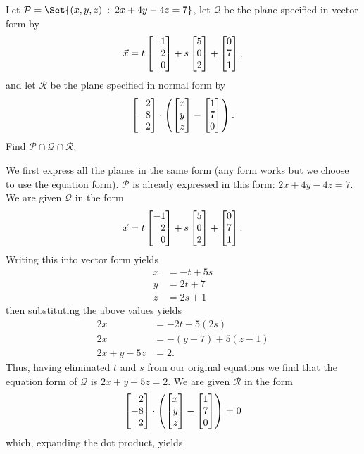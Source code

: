 \begin{exercises}
\begin{problist}
		\prob
		Let $\mathcal P=
			\Set{(x,y,z)\given 2x+4y-4z=7}
		$,
		let $\mathcal Q$ be the plane specified in vector form by
		\[
			\vec x = t\mat{-1\\2\\0}+s\mat{5\\0\\2}+\mat{0\\7\\1},
		\]
		and let $\mathcal R$ be the plane specified in normal form by
		\[
			\mat{2\\-8\\2} \cdot \left(\mat{x\\y\\z}-\mat{1\\7\\0}\right).
		\]
		Find $\mathcal P\cap\mathcal Q\cap\mathcal R$.
		\begin{solution}
			We first express all the planes in the same form (any form works but we choose to use the equation form).
			$\mathcal{P}$ is already expressed in this form: $2x+4y-4z=7$.\\
			We are given $\mathcal{Q}$ in the form
			\[
				\vec x=t\mat{-1\\2\\0}+s\mat{5\\0\\2}+\mat{0\\7\\1}.
			\]
			Writing this into vector form yields
			\begin{align*}
				x&=-t+5s\\
				y&=2t+7\\
				z&=2s+1
			\end{align*}
			then substituting the above values yields 
			\begin{align*}
				2x&=-2t+5(2s)\\
				2x&=-(y-7)+5(z-1)\\
				2x+y-5z&=2.
			\end{align*}
			Thus, having eliminated $t$ and $s$ from our original equations we find that the equation form of $\mathcal{Q}$ is $2x+y-5z=2$.
			We are given $\mathcal{R}$ in the form \[\mat{2\\-8\\2}\cdot \left(\mat{x\\y\\z}-\mat{1\\7\\0}\right)=0\]
			which, expanding the dot product, yields 
			\begin{align*}

\end{align*}
\end{solution}
\end{problist}
\end{exercises}
